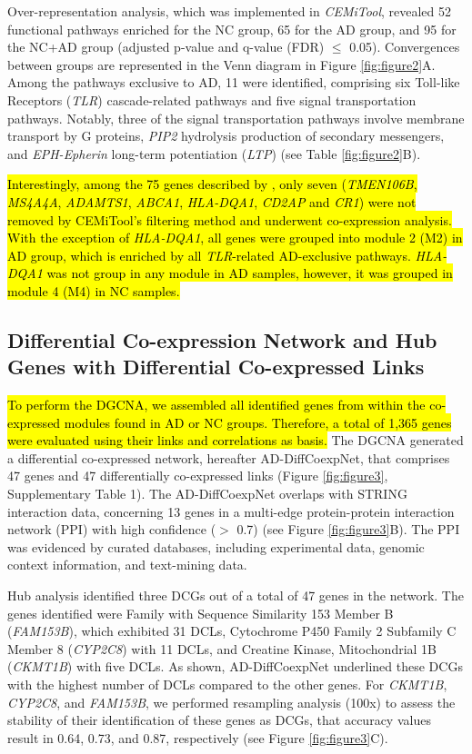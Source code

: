 \documentclass[utf8]{FrontiersinHarvard} %
\begin{document}
Over-representation analysis, which was implemented in \textit{CEMiTool}, revealed 52 functional pathways enriched for the NC group, 65 for the AD group, and 95 for the NC+AD group (adjusted p-value and q-value (FDR) $\leq$ 0.05). Convergences between groups are represented in the Venn diagram in Figure \ref{fig:figure2}A. Among the pathways exclusive to AD, 11 were identified, comprising six Toll-like Receptors (\textit{TLR}) cascade-related pathways and five signal transportation pathways. Notably, three of the signal transportation pathways involve membrane transport by G proteins, \textit{PIP2} hydrolysis production of secondary messengers, and \textit{EPH-Epherin} long-term potentiation (\textit{LTP}) (see Table \ref{fig:figure2}B).

\hl{Interestingly, among the 75 genes described by \citet{bellenguez2022new}, only seven (\textit{TMEN106B}, \textit{MS4A4A}, \textit{ADAMTS1}, \textit{ABCA1}, \textit{HLA-DQA1}, \textit{CD2AP} and \textit{CR1}) were not removed by CEMiTool's filtering method and underwent co-expression analysis. With the exception of \textit{HLA-DQA1}, all genes were grouped into module 2 (M2) in AD group, which is enriched by all \textit{TLR}-related AD-exclusive pathways. \textit{HLA-DQA1} was not group in any module in AD samples, however, it was grouped in module 4 (M4) in NC samples.}

\subsection{Differential Co-expression Network and Hub Genes with Differential Co-expressed Links}
\label{sec:diffcoexp}

\hl{To perform the DGCNA, we assembled all identified genes from within the co-expressed modules found in AD or NC groups. Therefore, a total of 1,365 genes were evaluated using their links and correlations as basis.} The DGCNA generated a differential co-expressed network, hereafter AD-DiffCoexpNet, that comprises 47 genes and 47 differentially co-expressed links (Figure \ref{fig:figure3}, Supplementary Table 1). The AD-DiffCoexpNet overlaps with STRING interaction data, concerning 13 genes in a multi-edge protein-protein interaction network (PPI) with high confidence ($>$ 0.7) (see Figure \ref{fig:figure3}B). The PPI was evidenced by curated databases, including experimental data, genomic context information, and text-mining data.

Hub analysis identified three DCGs out of a total of 47 genes in the network. The genes identified were Family with Sequence Similarity 153 Member B (\textit{FAM153B}), which exhibited 31 DCLs, Cytochrome P450 Family 2 Subfamily C Member 8 (\textit{CYP2C8}) with 11 DCLs, and Creatine Kinase, Mitochondrial 1B (\textit{CKMT1B}) with five DCLs. As shown, AD-DiffCoexpNet underlined these DCGs with the highest number of DCLs compared to the other genes. For \textit{CKMT1B}, \textit{CYP2C8}, and \textit{FAM153B}, we performed resampling analysis (100x) to assess the stability of their identification of these genes as DCGs, that accuracy values result in 0.64, 0.73, and 0.87, respectively (see Figure \ref{fig:figure3}C). 
\end{document}

